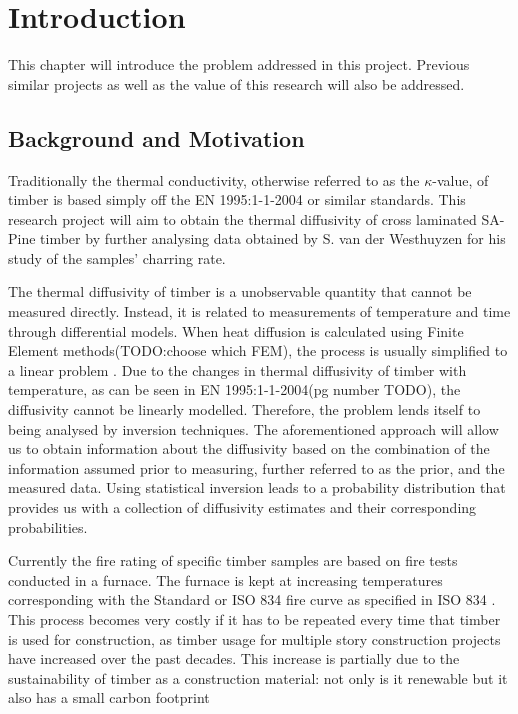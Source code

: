 \chapter{Introduction} \label{introduction}
This chapter will introduce the problem addressed in this project. 
Previous similar projects as well as the value of this research will also be addressed.

\section{Background and Motivation}

Traditionally the thermal conductivity, otherwise referred to as the $\kappa$-value, of timber is based simply off the EN 1995:1-1-2004 or similar standards.
This research project will aim to obtain the thermal diffusivity of cross laminated SA-Pine timber by further analysing data obtained by S. van der Westhuyzen for his study of the samples' charring rate.

The thermal diffusivity of timber is a unobservable quantity that cannot be measured directly. Instead, it is related to measurements of temperature and time through differential models. 
When heat diffusion is calculated using Finite Element methods(TODO:choose which FEM), the process is usually simplified to a linear problem \citep{Fish:2007}. 
Due to the changes in thermal diffusivity of timber with temperature, as can be seen in EN 1995:1-1-2004(pg number TODO), the diffusivity cannot be linearly modelled. 
Therefore, the problem lends itself to being analysed by inversion techniques. 
The aforementioned approach will allow us to obtain information about the diffusivity based on the combination of the information assumed prior to measuring, further referred to as the prior, and the measured data. 
Using statistical inversion leads to a probability distribution that provides us with a collection of diffusivity estimates and their corresponding probabilities.

Currently the fire rating of specific timber samples are based on fire tests conducted in a furnace. 
	The furnace is kept at increasing temperatures corresponding with the Standard or ISO 834 fire curve as specified in ISO 834 \citet{ISO:1999}.
	This process becomes very costly if it has to be repeated every time that timber is used for construction, as timber usage for multiple story construction projects have increased over the past decades. 
	This increase is partially due to the sustainability of timber as a construction material: not only is it renewable but it also has a small carbon footprint \citep{Salvadori:2017}
